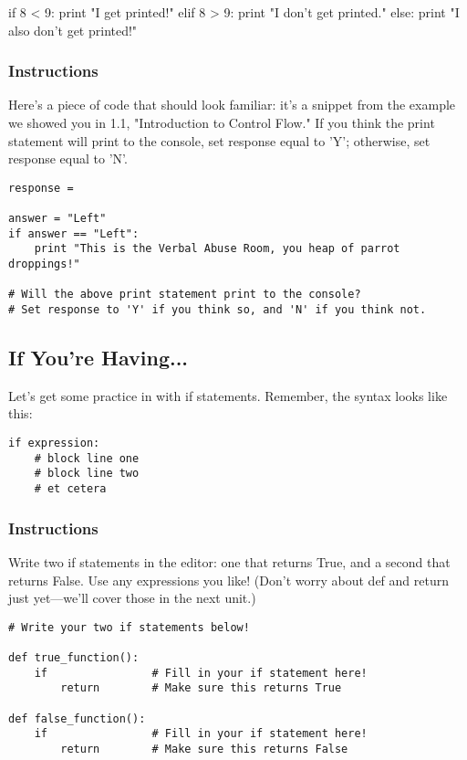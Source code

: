 \documentclass[12pt,a4paper,final,twoside,onecolumn,titlepage]{book}
\begin{document}
if 8 < 9:
    print "I get printed!"
elif 8 > 9:
    print "I don't get printed."
else:
    print "I also don't get printed!"

\subsubsection{Instructions}

Here's a piece of code that should look familiar: it's a snippet from the example we showed you in 1.1, "Introduction to Control Flow." If you think the print statement will print to the console, set response equal to 'Y'; otherwise, set response equal to 'N'.

\begin{lstlisting}
response = 

answer = "Left"
if answer == "Left":
    print "This is the Verbal Abuse Room, you heap of parrot droppings!"
    
# Will the above print statement print to the console?
# Set response to 'Y' if you think so, and 'N' if you think not.
\end{lstlisting}

\subsection{If You're Having...}

Let's get some practice in with if statements. Remember, the syntax looks like this:

\begin{lstlisting}
if expression:
    # block line one
    # block line two
    # et cetera
\end{lstlisting}

\subsubsection{Instructions}

Write two if statements in the editor: one that returns True, and a second that returns False. Use any expressions you like! (Don't worry about def and return just yet—we'll cover those in the next unit.)

\begin{lstlisting}
# Write your two if statements below!

def true_function():
    if                # Fill in your if statement here!
        return        # Make sure this returns True

def false_function():
    if                # Fill in your if statement here!
        return        # Make sure this returns False
\end{lstlisting}
\end{document}
